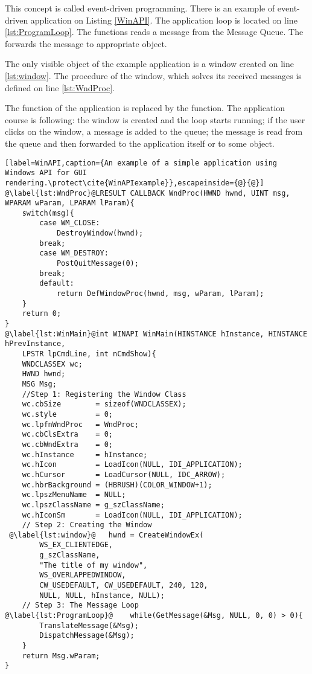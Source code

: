 This concept is called event-driven programming. There is an example of event-driven application on Listing \ref{WinAPI}. The application loop is located on line \ref{lst:ProgramLoop}. The  functions reads a message from the Message Queue. The  forwards the message to appropriate object.

The only visible object of the example application is a window created on line \ref{lst:window}. The procedure of the window, which solves its received messages is defined on line \ref{lst:WndProc}.

The  function of the application is replaced by the  function. The application course is following: the window is created and the loop starts running; if the user clicks on the window, a message is added to the queue; the message is read from the queue and then forwarded to the application itself or to some object.\cite[Chapter~2]{eventloopprogramming}

\begin{lstlisting}[label=WinAPI,caption={An example of a simple application using Windows API for GUI rendering.\protect\cite{WinAPIexample}},escapeinside={@}{@}]
@\label{lst:WndProc}@LRESULT CALLBACK WndProc(HWND hwnd, UINT msg, WPARAM wParam, LPARAM lParam){
    switch(msg){
        case WM_CLOSE:
            DestroyWindow(hwnd);
        break;
        case WM_DESTROY:
            PostQuitMessage(0);
        break;
        default:
            return DefWindowProc(hwnd, msg, wParam, lParam);
    }
    return 0;
}
@\label{lst:WinMain}@int WINAPI WinMain(HINSTANCE hInstance, HINSTANCE hPrevInstance,
    LPSTR lpCmdLine, int nCmdShow){
    WNDCLASSEX wc;
    HWND hwnd;
    MSG Msg;
    //Step 1: Registering the Window Class
    wc.cbSize        = sizeof(WNDCLASSEX);
    wc.style         = 0;
    wc.lpfnWndProc   = WndProc;
    wc.cbClsExtra    = 0;
    wc.cbWndExtra    = 0;
    wc.hInstance     = hInstance;
    wc.hIcon         = LoadIcon(NULL, IDI_APPLICATION);
    wc.hCursor       = LoadCursor(NULL, IDC_ARROW);
    wc.hbrBackground = (HBRUSH)(COLOR_WINDOW+1);
    wc.lpszMenuName  = NULL;
    wc.lpszClassName = g_szClassName;
    wc.hIconSm       = LoadIcon(NULL, IDI_APPLICATION);
    // Step 2: Creating the Window
 @\label{lst:window}@   hwnd = CreateWindowEx(
        WS_EX_CLIENTEDGE,
        g_szClassName,
        "The title of my window",
        WS_OVERLAPPEDWINDOW,
        CW_USEDEFAULT, CW_USEDEFAULT, 240, 120,
        NULL, NULL, hInstance, NULL);
    // Step 3: The Message Loop
@\label{lst:ProgramLoop}@    while(GetMessage(&Msg, NULL, 0, 0) > 0){
        TranslateMessage(&Msg);
        DispatchMessage(&Msg);
    }
    return Msg.wParam;
}
\end{lstlisting}

